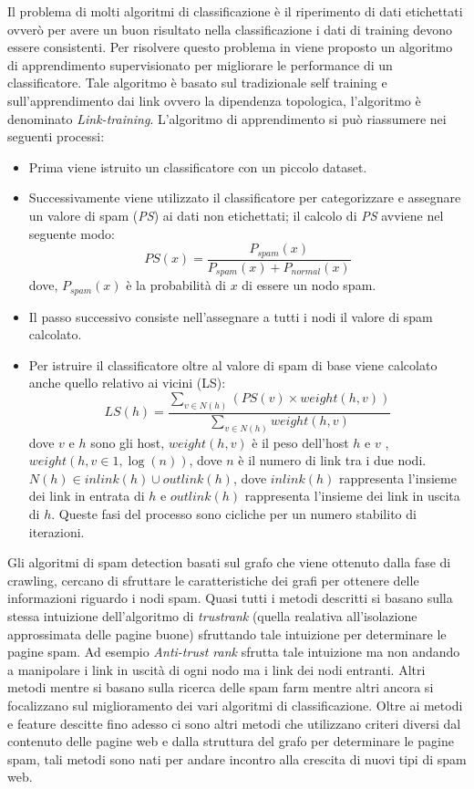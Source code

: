 Il problema di molti algoritmi di classificazione è il riperimento di dati etichettati ovverò per avere un buon risultato nella classificazione i dati di training devono essere consistenti. Per risolvere questo problema in \cite{Geng:2009:LBS:1526709.1526920} viene proposto un algoritmo di apprendimento supervisionato per migliorare le performance di un classificatore. Tale algoritmo è basato sul tradizionale self training e sull'apprendimento dai link ovvero la dipendenza topologica, l'algoritmo è denominato \textit{Link-training}. L'algoritmo di apprendimento si può riassumere nei seguenti processi:
\begin{itemize}
 \item Prima viene istruito un classificatore con un piccolo dataset.
 \item Successivamente viene utilizzato il classificatore per categorizzare e assegnare un valore di spam (\textit{PS}) ai dati non etichettati; il calcolo di \textit{PS} avviene nel seguente modo:
 \begin{equation}
  PS(x)=\frac{P_{spam}(x)}{P_{spam}(x)+P_{normal}(x)}
 \end{equation}
 dove, \(P_{spam}(x)\) è la probabilità di \(x\) di essere un nodo spam.
 \item Il passo successivo consiste nell'assegnare a tutti i nodi il valore di spam calcolato.
 \item Per istruire il classificatore oltre al valore di spam di base viene calcolato anche quello relativo ai vicini (LS):
 \begin{equation}
LS(h)=\frac{\sum_{v\in N(h)}(PS(v)\times weight(h,v))}{\sum_{v\in N(h)}weight(h,v)}
 \end{equation}
dove \(v\) e \(h\) sono gli host, \(weight(h,v)\) è il peso dell'host \(h\) e \(v\) , \(weight(h,v\in {1,\log{(n)}})\), dove \(n\) è il numero di link tra i due nodi. \(N(h)\in inlink(h) \cup outlink(h)\), dove \(inlink(h)\) rappresenta l'insieme dei link in entrata di \(h\) e \(outlink(h)\) rappresenta l'insieme dei link in uscita di \(h\). 
Queste fasi del processo sono cicliche per un numero stabilito di iterazioni.
\end{itemize}

Gli algoritmi di spam detection basati sul grafo che viene ottenuto dalla fase di crawling, cercano di sfruttare le caratteristiche dei grafi per ottenere delle informazioni riguardo i nodi spam. Quasi tutti i metodi descritti si basano sulla stessa intuizione dell'algoritmo di \textit{trustrank} (quella realativa all'isolazione approssimata delle pagine buone) sfruttando tale intuizione per determinare le pagine spam. Ad esempio \textit{Anti-trust rank} sfrutta tale intuizione ma non andando a manipolare i link in uscità di ogni nodo ma i link dei nodi entranti. Altri metodi mentre si basano sulla ricerca delle spam farm mentre altri ancora si focalizzano sul miglioramento dei vari algoritmi di classificazione. Oltre ai metodi e feature descitte fino adesso ci sono altri metodi che utilizzano criteri diversi dal contenuto delle pagine web e dalla struttura del grafo per determinare le pagine spam, tali metodi sono nati per andare incontro alla crescita di nuovi tipi di spam web.




